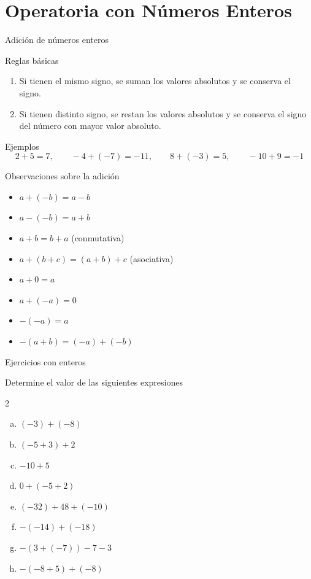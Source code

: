 \documentclass[aspectratio=169,10pt]{beamer}
\begin{document}
	\section{Operatoria con Números Enteros}
	
	\begin{frame}{Adición de números enteros}
		\begin{block}{Reglas básicas}
			\begin{enumerate}[<+->]
				\item Si tienen el mismo signo, se suman los valores absolutos y se conserva el signo.
				\item Si tienen distinto signo, se restan los valores absolutos y se conserva el signo del número con mayor valor absoluto.
			\end{enumerate}
		\end{block}
		
		\begin{exampleblock}{Ejemplos}
			\[
			2+5=7,\qquad -4+(-7)=-11,\qquad 8+(-3)=5,\qquad -10+9=-1
			\]
		\end{exampleblock}
	\end{frame}
	
	\begin{frame}{Observaciones sobre la adición}
		\begin{itemize}[<+->]
			\item \(a+(-b)=a-b\)
			\item \(a-(-b)=a+b\)
			\item \(a+b=b+a\) \hfill (conmutativa)
			\item \(a+(b+c)=(a+b)+c\) \hfill (asociativa)
			\item \(a+0=a\)
			\item \(a+(-a)=0\)
			\item \(-(-a)=a\)
			\item \(-(a+b)=(-a)+(-b)\)
		\end{itemize}
	\end{frame}
	
	\begin{frame}{Ejercicios con enteros}
		\begin{block}{Determine el valor de las siguientes expresiones}
			\begin{multicols}{2}
				\begin{enumerate}[a)]
					\item \((-3)+(-8)\)
					\item \((-5+3)+2\)
					\item \(-10+5\)
					\item \(0+(-5+2)\)
					\item \((-32)+48+(-10)\)
					\item \(-(-14)+(-18)\)
					\item \(-(3+(-7))-7-3\)
					\item \(-(-8+5)+(-8)\)
				\end{enumerate}
			\end{multicols}
		\end{block}
	\end{frame}
	
\end{document}
